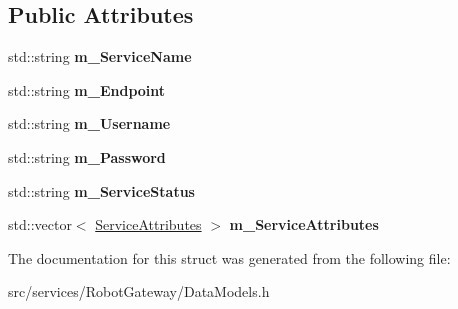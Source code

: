 \subsection*{Public Attributes}
\begin{DoxyCompactItemize}
\item 
\mbox{\label{struct_service_a45806d15e899202eeec43c9a1c9a7a4b}} 
std\+::string {\bfseries m\+\_\+\+Service\+Name}
\item 
\mbox{\label{struct_service_ade744363b67a5966732734738343c48c}} 
std\+::string {\bfseries m\+\_\+\+Endpoint}
\item 
\mbox{\label{struct_service_a9ae0d8cf645ac48813085bff9734a969}} 
std\+::string {\bfseries m\+\_\+\+Username}
\item 
\mbox{\label{struct_service_a2a62d210813a058f779cf2cdca1cf4e9}} 
std\+::string {\bfseries m\+\_\+\+Password}
\item 
\mbox{\label{struct_service_a050417ee376e77e019db92e6e5070b00}} 
std\+::string {\bfseries m\+\_\+\+Service\+Status}
\item 
\mbox{\label{struct_service_a7eab14e6f3509f6285d9b10fc721d0ba}} 
std\+::vector$<$ \hyperlink{struct_service_attributes}{Service\+Attributes} $>$ {\bfseries m\+\_\+\+Service\+Attributes}
\end{DoxyCompactItemize}


The documentation for this struct was generated from the following file\+:\begin{DoxyCompactItemize}
\item 
src/services/\+Robot\+Gateway/Data\+Models.\+h\end{DoxyCompactItemize}
